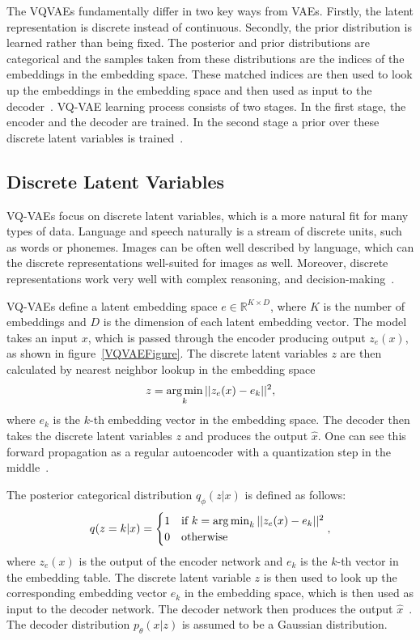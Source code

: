 The VQVAEs fundamentally differ in two key ways from VAEs. Firstly, the latent representation is discrete instead of continuous. Secondly, the prior distribution is learned rather than being fixed. The posterior and prior distributions are categorical and the samples taken from these distributions are the indices of the embeddings in the embedding space. These matched indices are then used to look up the embeddings in the embedding space and then used as input to the decoder~\cite{vqvae}. VQ-VAE learning process consists of two stages. In the first stage, the encoder and the decoder are trained. In the second stage a prior over these discrete latent variables is trained~\cite{vqvae}.

\subsection{Discrete Latent Variables}

VQ-VAEs focus on discrete latent variables, which is a more natural fit for many types of data. Language and speech naturally is a stream of discrete units, such as words or phonemes. Images can be often well described by language, which can the discrete representations well-suited for images as well. Moreover, discrete representations work very well with complex reasoning, and decision-making~\cite{vqvae}.

VQ-VAEs define a latent embedding space $ e \in \mathbb{R}^{K \times D} $, where $K$ is the number of embeddings and $D$ is the dimension of each latent embedding vector. The model takes an input $x$, which is passed through the encoder producing output $z_e(x)$, as shown in figure~\ref{VQVAEFigure}. 
The discrete latent variables $z$ are then calculated by nearest neighbor lookup in the embedding space
 \[ z = \operatorname*{arg\,min}_{k} || z_e(x) - e_k ||^2,\] 
where $e_k$ is the $k$-th embedding vector in the embedding space. The decoder then takes the discrete latent variables $z$ and produces the output $\hat{x}$. 
One can see this forward propagation as a regular autoencoder with a quantization step in the middle~\cite{vqvae}.

The posterior categorical distribution $q_{\phi}(z|x)$ is defined as follows:
\begin{equation} \label{eqVQVAEPosterior}
    q(z=k|x) = \begin{cases}
        1& \text{if} \ k = \operatorname*{arg\,min}_{k} || z_e(x) - e_k ||^2 \\
        0& \text{otherwise}
    \end{cases},
\end{equation}
where $z_e(x)$ is the output of the encoder network and $e_k$ is the $k$-th vector in the embedding table.
The discrete latent variable $z$ is then used to look up the corresponding embedding vector $e_k$ in the embedding space, which is then used as input to the decoder network. The decoder network then produces the output $\hat{x}$~\cite{vqvae}.
The decoder distribution $p_{\theta}(x|z)$ is assumed to be a Gaussian distribution.

